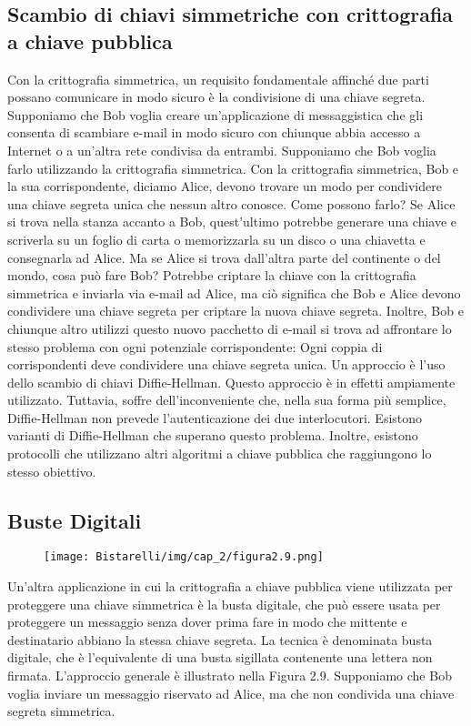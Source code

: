 \subsection{Scambio di chiavi simmetriche con crittografia a chiave pubblica}
Con la crittografia simmetrica, un requisito fondamentale affinché due parti possano comunicare in modo sicuro è la condivisione di una chiave segreta. Supponiamo che Bob voglia creare un'applicazione di messaggistica che gli consenta di scambiare e-mail in modo sicuro con chiunque abbia accesso a Internet o a un'altra rete condivisa da entrambi. Supponiamo che Bob voglia farlo utilizzando la crittografia simmetrica. Con la crittografia simmetrica, Bob e la sua corrispondente, diciamo Alice, devono trovare un modo per condividere una chiave segreta unica che nessun altro conosce. Come possono farlo? Se Alice si trova nella stanza accanto a Bob, quest'ultimo potrebbe generare una chiave e scriverla su un foglio di carta o memorizzarla su un disco o una chiavetta e consegnarla ad Alice. Ma se Alice si trova dall'altra parte del continente o del mondo, cosa può fare Bob? Potrebbe criptare la chiave con la crittografia simmetrica e inviarla via e-mail ad Alice, ma ciò significa che Bob e Alice devono condividere una chiave segreta per criptare la nuova chiave segreta. Inoltre, Bob e chiunque altro utilizzi questo nuovo pacchetto di e-mail si trova ad affrontare lo stesso problema con ogni potenziale corrispondente: Ogni coppia di corrispondenti deve condividere una chiave segreta unica. Un approccio è l'uso dello scambio di chiavi Diffie-Hellman. Questo approccio è in effetti ampiamente utilizzato. Tuttavia, soffre dell'inconveniente che, nella sua forma più semplice, Diffie-Hellman non prevede l'autenticazione dei due interlocutori. Esistono varianti di Diffie-Hellman che superano questo problema. Inoltre, esistono protocolli che utilizzano altri algoritmi a chiave pubblica che raggiungono lo stesso obiettivo.
\subsection{Buste Digitali}

\begin{figure}[H]
	\centering
    \texttt{[image: Bistarelli/img/cap\_2/figura2.9.png]}
\end{figure}


Un'altra applicazione in cui la crittografia a chiave pubblica viene utilizzata per proteggere una chiave simmetrica è la busta digitale, che può essere usata per proteggere un messaggio senza dover prima fare in modo che mittente e destinatario abbiano la stessa chiave segreta. La tecnica è denominata busta digitale, che è l'equivalente di una busta sigillata contenente una lettera non firmata. L'approccio generale è illustrato nella Figura 2.9. Supponiamo che Bob voglia inviare un messaggio riservato ad Alice, ma che non condivida una chiave segreta simmetrica. 

